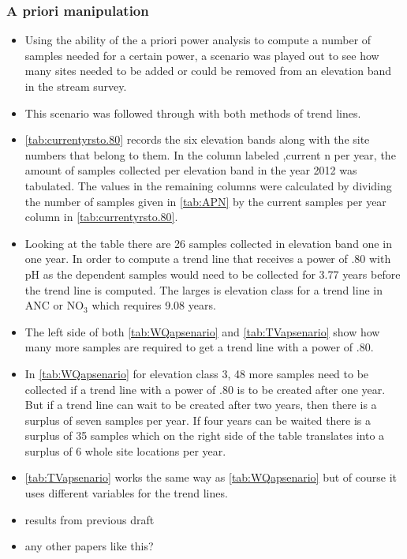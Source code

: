 \subsubsection{A priori manipulation}
\begin{itemize}
	\item Using the ability of the a priori power analysis to compute a number of samples needed for a certain power, a scenario was played out to see how many sites needed to be added or could be removed from an elevation band in the stream survey.
	\item This scenario was followed through with both methods of trend lines.
	\item \autoref{tab:currentyrsto.80} records the six elevation bands along with the site numbers that belong to them.  In the column labeled ,current n per year, the amount of samples collected per elevation band in the year 2012 was tabulated.  The values in the remaining columns were calculated by dividing the number of samples given in \autoref{tab:APN} by the current samples per year column in \autoref{tab:currentyrsto.80}.
	\item Looking at the table there are 26  samples collected in elevation band one in one year.  In order to compute a trend line that receives a power of .80 with pH as the dependent  samples would need to be collected for 3.77 years before the trend line is computed.   The larges is elevation class for a trend line in ANC or NO$_3$ which requires 9.08 years.
	
	\item The left side of both \autoref{tab:WQapsenario} and \autoref{tab:TVapsenario} show how many more samples are required to get a trend line with a power of .80. 
	\item  In \autoref{tab:WQapsenario} for elevation class 3, 48 more samples need to be collected if a trend line with a power of .80 is to be created after one year.  But if a trend line can wait to be created after two years, then there is a surplus of seven samples per year.  If four years can be waited there is a surplus of 35 samples which on the right side of the table translates into a surplus of 6 whole site locations per year.
	\item \autoref{tab:TVapsenario} works the same way as \autoref{tab:WQapsenario} but of course it uses different variables for the trend lines.
	\item results from previous draft
	\item any other papers like this?
\end{itemize}

